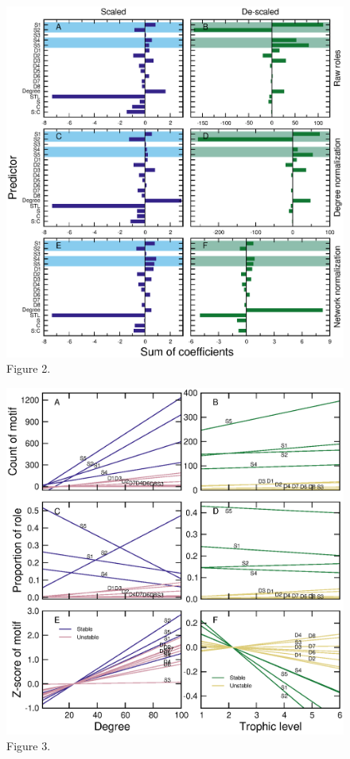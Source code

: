 \documentclass[12pt]{article}
\begin{document}
	\begin{figure}[h!]
		\label{coefficient_sum}
		\includegraphics[height=0.6\textheight]{figures/PLS/total_coefficients.eps}
		\caption{Figure 2.}
        \end{figure}

    \clearpage
    
	\begin{figure}[h!]
		\label{motif_vs_degTL}
		\includegraphics[height=.65\textheight]{figures/roles/motif_vs_oneD.eps}
		\caption{Figure 3.}
		\end{figure}
\end{document}
